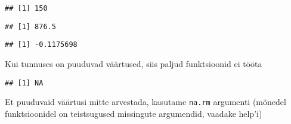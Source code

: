 \documentclass[
]{book}
\newenvironment{Shaded}{\begin{snugshade}}{\end{snugshade}}
\newcommand{\CommentTok}[1]{\textcolor[rgb]{0.56,0.35,0.01}{\textit{#1}}}
\newcommand{\ConstantTok}[1]{\textcolor[rgb]{0.00,0.00,0.00}{#1}}
\newcommand{\DecValTok}[1]{\textcolor[rgb]{0.00,0.00,0.81}{#1}}
\newcommand{\FunctionTok}[1]{\textcolor[rgb]{0.00,0.00,0.00}{#1}}
\newcommand{\NormalTok}[1]{#1}
\newcommand{\OtherTok}[1]{\textcolor[rgb]{0.56,0.35,0.01}{#1}}
\newcommand{\SpecialCharTok}[1]{\textcolor[rgb]{0.00,0.00,0.00}{#1}}
\begin{document}
\begin{Shaded}
\end{Shaded}

\begin{verbatim}
## [1] 150
\end{verbatim}

\begin{Shaded}
\end{Shaded}

\begin{verbatim}
## [1] 876.5
\end{verbatim}

\begin{Shaded}
\end{Shaded}

\begin{verbatim}
## [1] -0.1175698
\end{verbatim}

Kui tunnuses on puuduvad väärtused, siis paljud funktsioonid ei tööta

\begin{Shaded}
\end{Shaded}

\begin{verbatim}
## [1] NA
\end{verbatim}

Et puuduvaid väärtusi mitte arvestada, kasutame \texttt{na.rm} argumenti (mõnedel funktsioonidel on teistsugused missingute argumendid, vaadake help'i)
\end{document}
